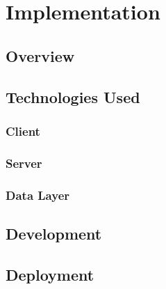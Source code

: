 \section{Implementation}																	
\label{sec:Implementation}

\subsection{Overview} 

\subsection{Technologies Used}

\subsubsection{Client}

\subsubsection{Server}

\subsubsection{Data Layer}

\subsection{Development}

\subsection{Deployment}
